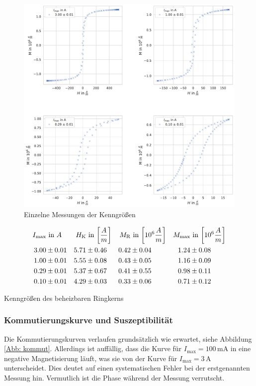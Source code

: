 \documentclass[12pt,a4paper]{scrartcl}
\numberwithin{equation}{section} %
\renewcommand{\[}{} %
\renewcommand{\]}{\noindent} %
\begin{document}
\begin{figure}
\centering
\includegraphics[scale=0.6]{../media/B2.4/3.3.1_single_measures.pdf}
\caption{Einzelne Messungen der Kenngrößen}
\label{Abb: heizbar kenngrößen}
\end{figure}

\begin{table}
	\begin{align*}
		I_\mathrm{max} &\text{ in } A &
		H_\mathrm{K} &\text{ in }
		{\tiny \left[ \frac{A}{m} \right] } &
		M_\mathrm{R} &\text{ in }
		{\tiny \left[10^6  \frac{A}{m} \right] } &
		M_\mathrm{max} &\text{ in }
		{\tiny \left[10^6 \frac{A}{m} \right] }
		\\
		3.00 &\pm 0.01 &
			5.71 &\pm 0.46 &
			0.42 &\pm 0.04 &
			1.24 &\pm 0.08
			\\
		1.00 &\pm 0.01 &
			5.55 &\pm 0.08 &
			0.43 &\pm 0.05 &
			1.16 &\pm 0.09
			\\
		0.29 &\pm 0.01 &
			5.37 &\pm 0.67 &
			0.41 &\pm 0.55 &
			0.98 &\pm 0.11
			\\
		0.10 &\pm 0.01 &
			4.29 &\pm 0.03 &
			0.33 &\pm 0.06 &
			0.71 &\pm 0.12
	\end{align*}
	\caption{Kenngrößen des beheizbaren Ringkerns}
	\label{Tab: heizbar kenngrößen}
\end{table}

\hypertarget{kommutierungskurve-und-suszeptibilituxe4t}{%
\subsubsection{Kommutierungskurve und Suszeptibilität}\label{kommutierungskurve-und-suszeptibilituxe4t}}
Die Kommutierungskurven verlaufen grundsätzlich wie erwartet, siehe Abbildung \ref{Abb: kommut}. Allerdings ist auffällig, dass die Kurve für \(I_\mathrm{max}=100\mathrm{\,mA}\) in eine negative Magnetisierung läuft, was sie von der Kurve für \(I_\mathrm{max}= 3\,\mathrm A\) unterscheidet. Dies deutet auf einen systematischen Fehler bei der erstgenannten Messung hin. Vermutlich ist die Phase während der Messung verrutscht.
\end{document}
